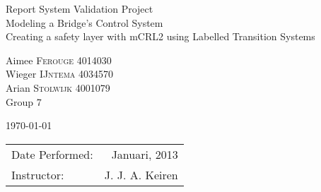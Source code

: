 \documentclass{article}
\begin{document}
\centering
\vspace{+150pt}
\LARGE{Report System Validation Project \\
  Modeling a Bridge's Control System\\
  Creating a safety layer with mCRL2 using Labelled Transition Systems} %
\vspace{+50pt} %

\Large{Aimee \textsc{Ferouge} 4014030 \\
  Wieger \textsc{IJntema} 4034570 \\
  Arian \textsc{Stolwijk} 4001079 \\
  Group 7} %
  
\vspace{+50pt} %
\today %
\vspace{+300pt} %

\vfill
\begin{center}
\begin{tabular}{l r}
Date Performed: & Januari, 2013 \\ %
Instructor: & J. J. A. Keiren %
\end{tabular}
\end{center}

\raggedright
\normalsize



\setcounter{page}{0}


\listoffigures
{}
\listoftables

\newpage
\tableofcontents
\newpage
\pagestyle{plain}
\setcounter{page}{1}
\setcounter{section}{0}

%

%



\newpage





\end{document}
